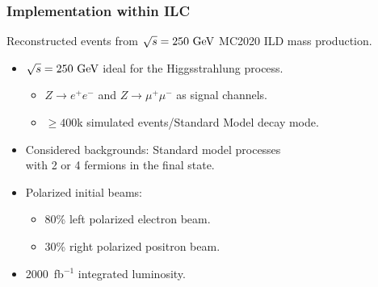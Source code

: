 \begin{frame}
    \frametitle{Implementation within ILC}
    Reconstructed events from $\sqrt{s} = 250~\text{G\text{e\kern-0.15ex V}}$ MC2020 ILD mass production.
    \begin{itemize}
        \item $\sqrt{s} = 250~\text{G\text{e\kern-0.15ex V}}$ ideal for the Higgsstrahlung process.
        \begin{itemize}
            \item $Z \to e^+ e^-$ and $Z \to \mu^+ \mu^-$ as signal channels.
            \item $\geq 400$k simulated events/Standard Model decay mode.
        \end{itemize}
        \item Considered backgrounds: Standard model processes \\
            with 2 or 4 fermions in the final state.
        \item Polarized initial beams:
        \begin{itemize}
            \item 80\% left polarized electron beam.
            \item 30\% right polarized positron beam.
        \end{itemize}
        \item 2000~fb$^{-1}$ integrated luminosity.
    \end{itemize}
    \end{frame}
